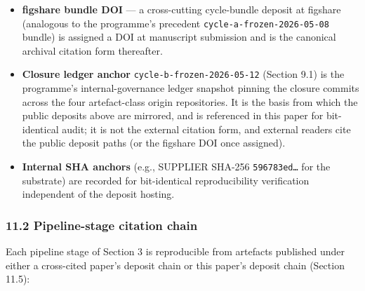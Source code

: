 \documentclass[
]{article}
\providecommand{\tightlist}{%
  \setlength{\itemsep}{0pt}\setlength{\parskip}{0pt}}
\begin{document}
\begin{itemize}
  \begin{itemize}
  \tightlist
  \item
    the public research repository
    \texttt{appsec-core-ontology-research/papers/08-pipeline-primitive-demonstration/artifacts/}
    receives the three artefact classes whose origin repositories are
    not publicly accessible (the knowledge graph runtime v1.2 + Manual
    ontology V2 YAML, the substrate-grounding evidence + gap-analysis
    outputs, and the closure brief);
  \item
    the public Manual repository \texttt{SbD-ToE/sbd-toe-manual} at the
    closure tag \texttt{cycle-b-frozen-2026-05-12} is the canonical
    citation form for the Manual prose corpus (the only artefact class
    whose origin repository is independently public).
  \end{itemize}
\item
  \textbf{figshare bundle DOI} --- a cross-cutting cycle-bundle deposit
  at figshare (analogous to the programme's precedent
  \texttt{cycle-a-frozen-2026-05-08} bundle) is assigned a DOI at
  manuscript submission and is the canonical archival citation form
  thereafter.
\item
  \textbf{Closure ledger anchor} \texttt{cycle-b-frozen-2026-05-12}
  (Section 9.1) is the programme's internal-governance ledger snapshot
  pinning the closure commits across the four artefact-class origin
  repositories. It is the basis from which the public deposits above are
  mirrored, and is referenced in this paper for bit-identical audit; it
  is not the external citation form, and external readers cite the
  public deposit paths (or the figshare DOI once assigned).
\item
  \textbf{Internal SHA anchors} (e.g., SUPPLIER SHA-256
  \texttt{596783ed…} for the substrate) are recorded for bit-identical
  reproducibility verification independent of the deposit hosting.
\end{itemize}

\subsubsection{11.2 Pipeline-stage citation
chain}\label{pipeline-stage-citation-chain}

Each pipeline stage of Section 3 is reproducible from artefacts
published under either a cross-cited paper's deposit chain or this
paper's deposit chain (Section 11.5):
\end{document}
